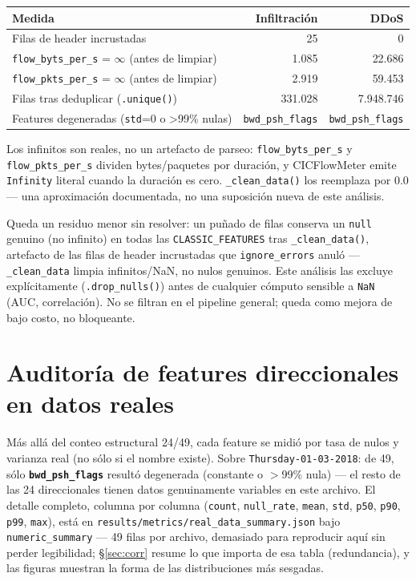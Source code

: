 \documentclass[11pt]{article}
\newcommand{\code}[1]{\texttt{\small #1}}
\begin{document}
\begin{center}
\begin{tabular}{@{}lrr@{}}
\toprule
\textbf{Medida} & \textbf{Infiltración} & \textbf{DDoS} \\
\midrule
Filas de header incrustadas & 25 & 0 \\
\code{flow\_byts\_per\_s} = $\infty$ (antes de limpiar) & 1.085 & 22.686 \\
\code{flow\_pkts\_per\_s} = $\infty$ (antes de limpiar) & 2.919 & 59.453 \\
Filas tras deduplicar (\code{.unique()}) & 331.028 & 7.948.746 \\
Features degeneradas (\code{std}=0 o >99\% nulas) & \code{bwd\_psh\_flags} & \code{bwd\_psh\_flags} \\
\bottomrule
\end{tabular}
\end{center}

Los infinitos son reales, no un artefacto de parseo: \code{flow\_byts\_per\_s} y
\code{flow\_pkts\_per\_s} dividen bytes/paquetes por duración, y CICFlowMeter emite
\code{Infinity} literal cuando la duración es cero. \code{\_clean\_data()} los reemplaza
por 0.0 --- una aproximación documentada, no una suposición nueva de este análisis.

Queda un residuo menor sin resolver: un puñado de filas conserva un \code{null} genuino
(no infinito) en todas las \code{CLASSIC\_FEATURES} tras \code{\_clean\_data()}, artefacto
de las filas de header incrustadas que \code{ignore\_errors} anuló --- \code{\_clean\_data}
limpia infinitos/NaN, no nulos genuinos. Este análisis las excluye explícitamente
(\code{.drop\_nulls()}) antes de cualquier cómputo sensible a \code{NaN} (AUC, correlación).
No se filtran en el pipeline general; queda como mejora de bajo costo, no bloqueante.

\section{Auditoría de features direccionales en datos reales}

Más allá del conteo estructural 24/49, cada feature se midió por tasa de nulos y varianza
real (no sólo si el nombre existe). Sobre \code{Thursday-01-03-2018}: de 49, sólo
\textbf{\code{bwd\_psh\_flags}} resultó degenerada (constante o $>$99\% nula) --- el resto
de las 24 direccionales tienen datos genuinamente variables en este archivo. El detalle
completo, columna por columna (\code{count}, \code{null\_rate}, \code{mean}, \code{std},
\code{p50}, \code{p90}, \code{p99}, \code{max}), está en
\code{results/metrics/real\_data\_summary.json} bajo \code{numeric\_summary} --- 49 filas
por archivo, demasiado para reproducir aquí sin perder legibilidad; \S\ref{sec:corr} resume
lo que importa de esa tabla (redundancia), y las figuras muestran la forma de las
distribuciones más sesgadas.
\end{document}

